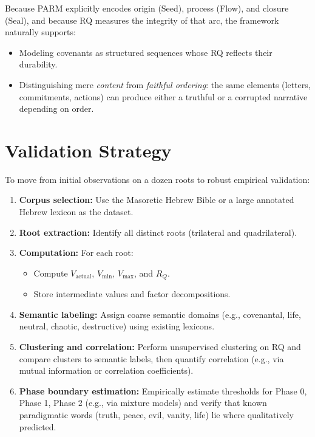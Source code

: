 \documentclass[11pt]{article}
\begin{document}
Because PARM explicitly encodes origin (Seed), process (Flow), and closure (Seal), and because RQ measures the integrity of that arc, the framework naturally supports:
\begin{itemize}
    \item Modeling covenants as structured sequences whose RQ reflects their durability.
    \item Distinguishing mere \emph{content} from \emph{faithful ordering}: the same elements (letters, commitments, actions) can produce either a truthful or a corrupted narrative depending on order.
\end{itemize}

\section{Validation Strategy}

To move from initial observations on a dozen roots to robust empirical validation:

\begin{enumerate}
    \item \textbf{Corpus selection:} Use the Masoretic Hebrew Bible or a large annotated Hebrew lexicon as the dataset.
    \item \textbf{Root extraction:} Identify all distinct roots (trilateral and quadrilateral).
    \item \textbf{Computation:} For each root:
    \begin{itemize}
        \item Compute $V_{\text{actual}}$, $V_{\min}$, $V_{\max}$, and $R_Q$.
        \item Store intermediate values and factor decompositions.
    \end{itemize}
    \item \textbf{Semantic labeling:} Assign coarse semantic domains (e.g., covenantal, life, neutral, chaotic, destructive) using existing lexicons.
    \item \textbf{Clustering and correlation:} Perform unsupervised clustering on RQ and compare clusters to semantic labels, then quantify correlation (e.g., via mutual information or correlation coefficients).
    \item \textbf{Phase boundary estimation:} Empirically estimate thresholds for Phase 0, Phase 1, Phase 2 (e.g., via mixture models) and verify that known paradigmatic words (truth, peace, evil, vanity, life) lie where qualitatively predicted.
\end{enumerate}
\end{document}
